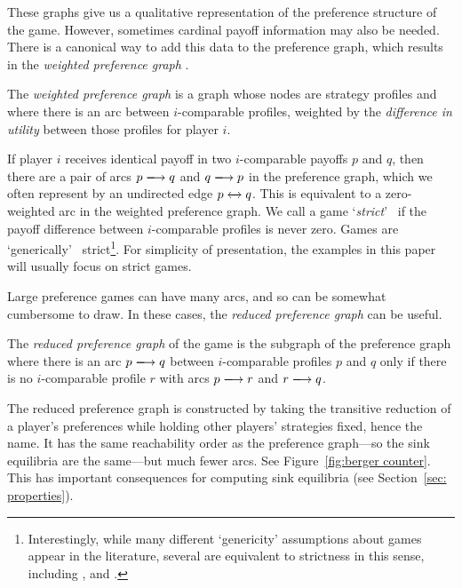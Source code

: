 \documentclass[preprint,authoryear]{elsarticle}
\begin{document}
These graphs give us a qualitative representation of the preference structure of the game. However, sometimes cardinal payoff information may also be needed. There is a canonical way to add this data to the preference graph, which results in the \emph{weighted preference graph} \citep{biggar_graph_2023}.

\begin{defn} \label{def: weighted preference}
    The \emph{weighted preference graph} is a graph whose nodes are strategy profiles and where there is an arc between $i$-comparable profiles, weighted by the \emph{difference in utility} between those profiles for player $i$.
\end{defn}

If player $i$ receives identical payoff in two $i$-comparable payoffs $p$ and $q$, then there are a pair of arcs $\arc{p}{q}$ and $\arc{q}{p}$ in the preference graph, which we often represent by an  undirected edge $p \xleftrightarrow[]{} q$. This is equivalent to a zero-weighted arc in the weighted preference graph. We call a game `\emph{strict}'~\citep{biggar_graph_2023} if the payoff difference between $i$-comparable profiles is never zero. Games are `generically'~\citep{fudenberg1991game} strict\footnote{Interestingly, while many different `genericity' assumptions about games appear in the literature, several are equivalent to strictness in this sense, including \cite[Section 2.3]{shapley_topics_1964}, \cite[Section 3]{monderer_fictitious_1997} and \cite[Def. 4]{berger_two_2007}.}. For simplicity of presentation, the examples in this paper will usually focus on strict games.

Large preference games can have many arcs, and so can be somewhat cumbersome to draw. In these cases, the \emph{reduced preference graph} can be useful.
\begin{defn} \label{def: reduced preference}
    The \emph{reduced preference graph} of the game is the subgraph of the preference graph where there is an arc $\arc{p}{q}$ between $i$-comparable profiles $p$ and $q$ only if there is no $i$-comparable profile $r$ with arcs $\arc{p}{r}$ and $\arc{r}{q}$.
\end{defn}

The reduced preference graph is constructed by taking the transitive reduction of a player's preferences while holding other players' strategies fixed, hence the name. It has the same reachability order as the preference graph---so the sink equilibria are the same---but much fewer arcs. See Figure~\ref{fig:berger counter}. This has important consequences for computing sink equilibria (see Section~\ref{sec: properties}).
\end{document}
